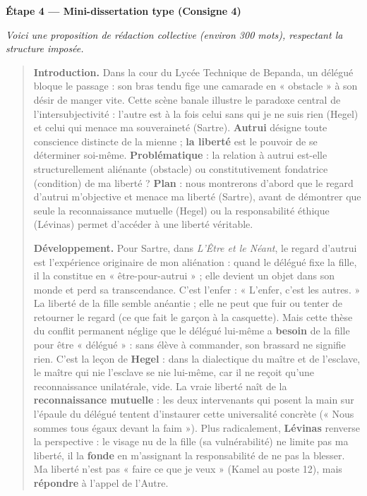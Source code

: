 \documentclass[11pt]{article}
\newcommand{\cle}[1]{{\popxbold\color{popdark}#1}}
\begin{document}
\begin{exoresolu}
\textbf{Étape 4 — Mini-dissertation type (Consigne 4)}

\emph{Voici une proposition de rédaction collective (environ 300 mots), respectant la structure imposée.}

\begin{quote}
\textbf{Introduction.} Dans la cour du Lycée Technique de Bepanda, un délégué bloque le passage : son bras tendu fige une camarade en « obstacle » à son désir de manger vite. Cette scène banale illustre le paradoxe central de l'intersubjectivité : l'autre est à la fois celui sans qui je ne suis rien (Hegel) et celui qui menace ma souveraineté (Sartre). \textbf{Autrui} désigne toute conscience distincte de la mienne ; \textbf{la liberté} est le pouvoir de se déterminer soi-même. \textbf{Problématique} : la relation à autrui est-elle structurellement aliénante (obstacle) ou constitutivement fondatrice (condition) de ma liberté ? \textbf{Plan} : nous montrerons d'abord que le regard d'autrui m'objective et menace ma liberté (Sartre), avant de démontrer que seule la reconnaissance mutuelle (Hegel) ou la responsabilité éthique (Lévinas) permet d'accéder à une liberté véritable.

\textbf{Développement.} Pour Sartre, dans \textit{L'Être et le Néant}, le \cle{regard} d'autrui est l'expérience originaire de mon aliénation : quand le délégué fixe la fille, il la constitue en « être-pour-autrui » ; elle devient un objet dans son monde et perd sa transcendance. C'est l'enfer : « L'enfer, c'est les autres. » La liberté de la fille semble anéantie ; elle ne peut que fuir ou tenter de retourner le regard (ce que fait le garçon à la casquette). Mais cette thèse du conflit permanent néglige que le délégué lui-même a \textbf{besoin} de la fille pour être « délégué » : sans élève à commander, son brassard ne signifie rien. C'est la leçon de \textbf{Hegel} : dans la dialectique du maître et de l'esclave, le maître qui nie l'esclave se nie lui-même, car il ne reçoit qu'une reconnaissance unilatérale, vide. La vraie liberté naît de la \textbf{reconnaissance mutuelle} : les deux intervenants qui posent la main sur l'épaule du délégué tentent d'instaurer cette universalité concrète (« Nous sommes tous égaux devant la faim »). Plus radicalement, \textbf{Lévinas} renverse la perspective : le visage nu de la fille (sa vulnérabilité) ne limite pas ma liberté, il la \textbf{fonde} en m'assignant la responsabilité de ne pas la blesser. Ma liberté n'est pas « faire ce que je veux » (Kamel au poste 12), mais \textbf{répondre} à l'appel de l'Autre.


\end{quote}
\end{exoresolu}
\end{document}

